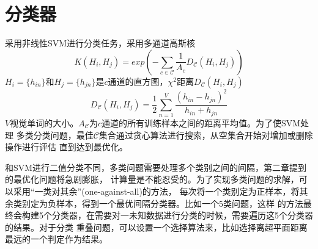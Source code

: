 \section{分类器}
\cite{stip}采用非线性SVM进行分类任务，采用多通道高斯核
\begin{equation}
    K(H_i,H_j)=exp(-\sum_{c\in\mathcal{C}}\frac{1}{A_c}D_{\mathcal{C}}(H_i,H_j))
\end{equation}
$H_i=\{h_{in}\}$和$H_j=\{h_{jn}\}$是$c$通道的直方图，$\chi^2$距离$D_{\mathcal{C}}(H_i,H_j)$
\begin{equation}
    D_{\mathcal{C}}(H_i,H_j)=\frac{1}{2}\sum^V_{n=1}\frac{(h_{in}-h_{jn})^2}{h_{in}+h_{jn}}
\end{equation}
$V$视觉单词的大小。$A_{\mathcal{C}}$为$c$通道的所有训练样本之间的距离平均值。为了使SVM处理
多类分类问题，最佳$\mathcal{C}$集合通过贪心算法进行搜索，从空集合开始对增加或删除操作进行评估
直到达到最优化。

和SVM进行二值分类不同，多类问题需要处理多个类别之间的间隔，第二章提到的最优化问题将急剧膨胀，
计算量是不能忍受的。为了实现多类问题的求解，可以采用``一类对其余''(one-against-all)的方法，
每次将一个类别定为正样本，将其余类别定为负样本，得到一个最优间隔分类器。比如一个5类问题，这样
的方法最终会构建5个分类器，在需要对一未知数据进行分类的时候，需要遍历这5个分类器的结果。对于分类
重叠问题，可以设置一个选择算法来，比如选择离超平面距离最远的一个判定作为结果。

